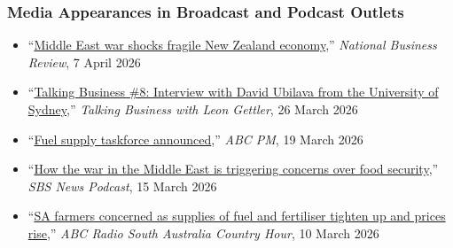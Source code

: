 \documentclass[10pt]{article}
\begin{document}
	\subsubsection*{Media Appearances in Broadcast and Podcast Outlets} 
	\begin{itemize} 
		\item ``\href{https://www.nbr.co.nz/dollars-and-sense/middle-east-war-shocks-the-fragile-new-zealand-economy/}{Middle East war shocks fragile New Zealand economy},'' \textit{National Business Review}, 7 April 2026
		\item ``\href{https://shows.acast.com/talkingbusiness/episodes/talking-business-8-interview-with-david-ubilava-from-the-uni}{Talking Business \#8: Interview with David Ubilava from the University of Sydney},'' \textit{Talking Business with Leon Gettler}, 26 March 2026
		\item ``\href{https://www.abc.net.au/listen/programs/pm/fuel-supply-taskforce-announced-/106475292}{Fuel supply taskforce announced},'' \textit{ABC PM}, 19 March 2026 
		\item ``\href{https://www.sbs.com.au/news/podcast-episode/how-the-war-in-the-middle-east-is-triggering-concerns-over-food-security/5qwqg147s}{How the war in the Middle East is triggering concerns over food security},'' \textit{SBS News Podcast}, 15 March 2026 
		\item ``\href{https://www.abc.net.au/listen/programs/sa-country-hour/sa-country-hour/106427360}{SA farmers concerned as supplies of fuel and fertiliser tighten up and prices rise},'' \textit{ABC Radio South Australia Country Hour}, 10 March 2026
	\end{itemize}
	
\end{document}
